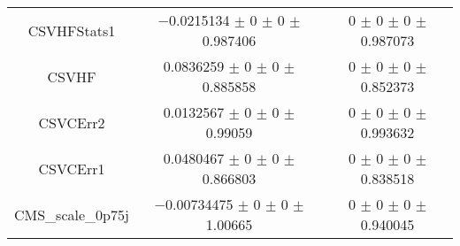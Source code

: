 \begin{table}
\begin{tabular}{ccc}
CSVHFStats1 	& \num{-0.0215134} $\pm$ \num{0} $\pm$ \num{0} $\pm$ \num{0.987406} 	& \num{0} $\pm$ \num{0} $\pm$ \num{0} $\pm$ \num{0.987073}\\
CSVHF 	& \num{0.0836259} $\pm$ \num{0} $\pm$ \num{0} $\pm$ \num{0.885858} 	& \num{0} $\pm$ \num{0} $\pm$ \num{0} $\pm$ \num{0.852373}\\
CSVCErr2 	& \num{0.0132567} $\pm$ \num{0} $\pm$ \num{0} $\pm$ \num{0.99059} 	& \num{0} $\pm$ \num{0} $\pm$ \num{0} $\pm$ \num{0.993632}\\
CSVCErr1 	& \num{0.0480467} $\pm$ \num{0} $\pm$ \num{0} $\pm$ \num{0.866803} 	& \num{0} $\pm$ \num{0} $\pm$ \num{0} $\pm$ \num{0.838518}\\
CMS\_scale\_0p75j 	& \num{-0.00734475} $\pm$ \num{0} $\pm$ \num{0} $\pm$ \num{1.00665} 	& \num{0} $\pm$ \num{0} $\pm$ \num{0} $\pm$ \num{0.940045}\\
\bottomrule
\end{tabular}
\end{table}